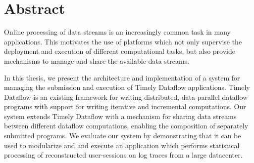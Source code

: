 \begingroup
\let\clearpage\relax
\let\cleardoublepage\relax
\let\cleardoublepage\relax

\chapter*{Abstract}

Online processing of data streams is an increasingly
common task in many applications. This motivates the use of platforms which
not only supervise the deployment and execution of different
computational tasks, but also provide mechanisms to manage and share the
available data streams.

In this thesis, we present the architecture and implementation of a system
for managing the submission and execution of Timely Dataflow applications.
Timely Dataflow is an existing framework for writing distributed, data-parallel
dataflow programs with support for writing iterative and incremental computations.
Our system extends Timely Dataflow
with a mechanism for sharing data streams between different dataflow computations,
enabling the composition of separately submitted programs. We evaluate our system
by demonstrating that it can be used to modularize and and execute an application
which performs statistical processing of reconstructed user-sessions on
log traces from a large datacenter.

\endgroup
